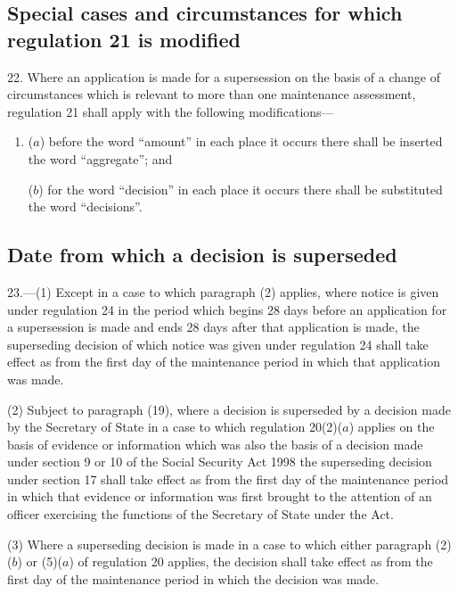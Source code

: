 \documentclass[a4paper,12pt]{article}
\begin{document}
\subsection[22. Special cases and circumstances for which regulation 21 is modified]{Special cases and circumstances for which regulation 21 is modified}

22.  Where an application is made for a supersession on the basis of a change of circumstances which is relevant to more than one maintenance assessment, regulation 21 shall apply with the following modifications---
\begin{enumerate}\item[]
($a$) before the word “amount” in each place it occurs there shall be inserted the word “aggregate”; and

($b$) for the word “decision” in each place it occurs there shall be substituted the word “decisions”.
\end{enumerate}

\subsection[23. Date from which a decision is superseded]{Date from which a decision is superseded}

23.—(1) Except in a case to which paragraph (2) applies, where notice is given under regulation 24 in the period which begins 28 days before an application for a supersession is made and ends 28 days after that application is made, the superseding decision of which notice was given under regulation 24 shall take effect as from the first day of the maintenance period in which that application was made.

(2) 
Subject to paragraph (19), where a decision is superseded  %
by a decision made by the Secretary of State in a case to which regulation 20(2)($a$) applies on the basis of evidence or information which was also the basis of a decision made under section 9 or 10 of the Social Security Act 1998 the superseding decision under section 17 shall take effect as from the first day of the maintenance period in which that evidence or information was first brought to the attention of an officer exercising the functions of the Secretary of State under the Act.

(3) Where a superseding decision is made in a case to which either paragraph (2)($b$) or (5)($a$) of regulation 20 applies, the decision shall take effect as from the first day of the maintenance period in which the decision was made.
\end{document}
